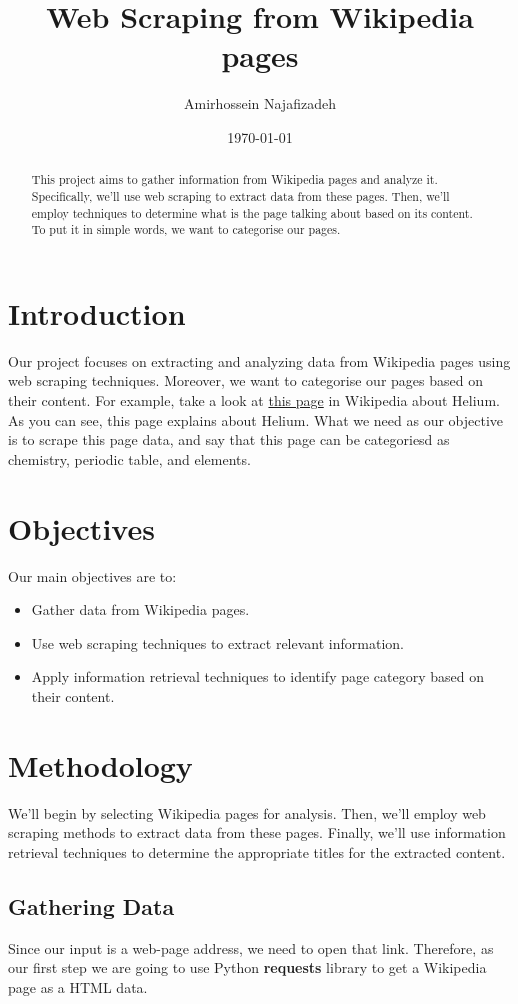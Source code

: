 \documentclass{article}
\title{Web Scraping from Wikipedia pages}
\author{Amirhossein Najafizadeh}
\date{\today}
\begin{document}
\maketitle

\begin{abstract}
This project aims to gather information from Wikipedia pages and analyze it. Specifically, we'll use web scraping to extract data from these pages. Then, we'll employ techniques to determine what is the page talking about based on its content.
To put it in simple words, we want to categorise our pages.
\end{abstract}

\section{Introduction}
Our project focuses on extracting and analyzing data from Wikipedia pages using web scraping techniques. Moreover, we want
to categorise our pages based on their content. For example, take a look at \href{https://en.wikipedia.org/wiki/Helium}{this page} in Wikipedia about Helium.
As you can see, this page explains about Helium. What we need as our objective is to scrape this page data, and say that this page can be categoriesd as
chemistry, periodic table, and elements.

\section{Objectives}
Our main objectives are to:
\begin{itemize}
    \item Gather data from Wikipedia pages.
    \item Use web scraping techniques to extract relevant information.
    \item Apply information retrieval techniques to identify page category based on their content.
\end{itemize}

\section{Methodology}
We'll begin by selecting Wikipedia pages for analysis. Then, we'll employ web scraping methods to extract data from these pages. Finally, we'll use information retrieval techniques to determine the appropriate titles for the extracted content.

\subsection{Gathering Data}
Since our input is a web-page address, we need to open that link. Therefore, as our first step we are going to use Python \textbf{requests} library to get a Wikipedia page as a HTML data.
\end{document}
